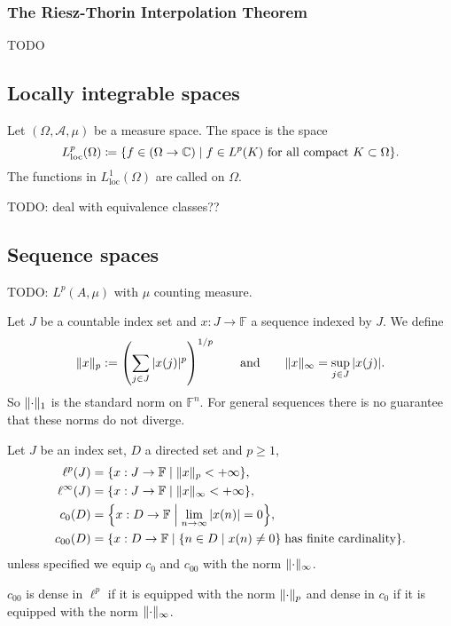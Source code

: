 \subsubsection{The Riesz-Thorin Interpolation Theorem}
TODO

\subsection{Locally integrable spaces}
\begin{definition}
Let $(\Omega, \mathcal{A}, \mu)$ be a measure space. The  space is the space
\[ L^p_\text{loc}(\Omega) \defeq \setbuilder{f \in (\Omega\to\C)}{\text{$f\in L^p(K)$ for all compact $K\subset \Omega$}}. \]
The functions in $L^1_\text{loc}(\Omega)$ are called  on $\Omega$.
\end{definition}
TODO: deal with equivalence classes??

\subsection{Sequence spaces}
TODO:  $L^p(A,\mu)$ with $\mu$ counting measure.

Let $J$ be a countable index set and $x:J\to \mathbb{F}$ a sequence indexed by $J$. We define
\[ \lVert x\rVert_p := \left(\sum_{j\in J}|x(j)|^p\right)^{1/p} \qquad\text{and}\qquad \lVert x\rVert_\infty = \sup_{j\in J}|x(j)|. \]
So $\lVert\cdot\rVert_1$ is the standard norm on $\mathbb{F}^n$. For general sequences there is no guarantee that these norms do not diverge.
\begin{definition}
Let $J$ be an index set, $D$ a directed set and $p\geq 1$,
\begin{align*}
\ell^p(J) &= \setbuilder{x:J\to \F}{\norm{x}_p < +\infty},\\
\ell^\infty(J) &= \setbuilder{x:J\to \F}{\norm{x}_\infty < +\infty},\\
c_0(D) &= \setbuilder{x:D\to \F}{\lim_{n\to\infty}|x(n)| = 0}, \\
c_{00}(D) &= \setbuilder{x:D\to \F}{\setbuilder{n\in D}{x(n)\neq 0}\;\text{has finite cardinality}}.
\end{align*}
unless specified we equip $c_0$ and $c_{00}$ with the norm $\lVert\cdot\rVert_\infty$.
\end{definition}

\begin{lemma}
$c_{00}$ is dense in $\ell^p$ if it is equipped with the norm $\lVert\cdot\rVert_p$ and dense in $c_0$ if it is equipped with the norm $\lVert\cdot\rVert_\infty$.
\end{lemma}

